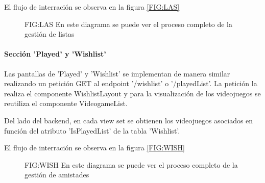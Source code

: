 El flujo de interración se observa en la figura \ref{FIG:LAS}

\begin{figure}[Componentes implicados para la sección 'Mis listas']{FIG:LAS}{ En este diagrama se puede ver el proceso completo de la gestión de listas}
\end{figure}

\paragraph{Sección 'Played' y 'Wishlist'}
Las pantallas de 'Played' y 'Wishlist' se implementan de manera similar realizando un petición GET al endpoint '/wishlist' o '/playedList'. La petición 
la realiza el componente WishlistLayout y para la visualización de los videojuegos se reutiliza el componente VideogameList.

Del lado del backend, en cada view set se obtienen los videojuegos asociados en función del atributo 'IsPlayedList' de la tabla 'Wishlist'.

El flujo de interración se observa en la figura \ref{FIG:WISH}

\begin{figure}[Componentes implicados para la sección 'Amistades']{FIG:WISH}{ En este diagrama se puede ver el proceso completo de la gestión de amistades}
\end{figure}